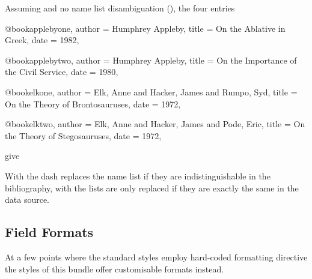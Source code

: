 \documentclass[DIV=9]{scrartcl}
\begin{document}
\begin{optionlist}
\begin{refsection}
\makeatletter
Assuming  and no name list disambiguation
(), the four entries
\begin{bibbibtexcode}
@book{applebyone,
  author  = {Humphrey Appleby},
  title   = {On the Ablative in Greek},
  date    = {1982},
}

@book{applebytwo,
  author  = {Humphrey Appleby},
  title   = {On the Importance of the Civil Service},
  date    = {1980},
}

@book{elkone,
  author  = {Elk, Anne and Hacker, James and Rumpo, Syd},
  title   = {On the Theory of Brontosauruses},
  date    = {1972},
}

@book{elktwo,
  author  = {Elk, Anne and Hacker, James and Pode, Eric},
  title   = {On the Theory of Stegosauruses},
  date    = {1972},
}
\end{bibbibtexcode}
give
\let\ExecuteBibliographyOptions\@gobble
\nocite{elkone,elktwo,applebyone,applebytwo}
\begin{bibexample}[title={\kvopt{dashed}{false}}]
\printbibliography[heading=none]
\end{bibexample}

\begin{bibexample}[title={\kvopt{dashed}{bibnamehash}}]
\printbibliography[heading=none]
\end{bibexample}

\begin{bibexample}[title={\kvopt{dashed}{fullhash}}]
\printbibliography[heading=none]
\end{bibexample}
\makeatother
\end{refsection}
With  the dash replaces the name list if they are
indistinguishable in the bibliography, with  the lists
are only replaced if they are exactly the same in the data source.
\end{optionlist}

\subsection{Field Formats}
At a few points where the standard styles employ hard-coded formatting directive
the styles of this bundle offer customisable formats instead.
\end{document}
